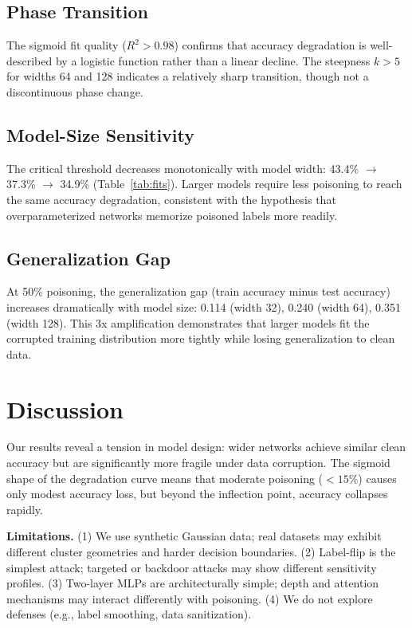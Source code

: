 \documentclass[11pt,a4paper]{article}
\begin{document}
\subsection{Phase Transition}
The sigmoid fit quality ($R^2 > 0.98$) confirms that accuracy degradation is well-described by a logistic function rather than a linear decline. The steepness $k > 5$ for widths 64 and 128 indicates a relatively sharp transition, though not a discontinuous phase change.

\subsection{Model-Size Sensitivity}
The critical threshold decreases monotonically with model width: 43.4\% $\to$ 37.3\% $\to$ 34.9\% (Table~\ref{tab:fits}). Larger models require less poisoning to reach the same accuracy degradation, consistent with the hypothesis that overparameterized networks memorize poisoned labels more readily.

\subsection{Generalization Gap}
At 50\% poisoning, the generalization gap (train accuracy minus test accuracy) increases dramatically with model size: 0.114 (width 32), 0.240 (width 64), 0.351 (width 128). This 3x amplification demonstrates that larger models fit the corrupted training distribution more tightly while losing generalization to clean data.

\section{Discussion}

Our results reveal a tension in model design: wider networks achieve similar clean accuracy but are significantly more fragile under data corruption. The sigmoid shape of the degradation curve means that moderate poisoning ($< 15\%$) causes only modest accuracy loss, but beyond the inflection point, accuracy collapses rapidly.

\textbf{Limitations.} (1) We use synthetic Gaussian data; real datasets may exhibit different cluster geometries and harder decision boundaries. (2) Label-flip is the simplest attack; targeted or backdoor attacks may show different sensitivity profiles. (3) Two-layer MLPs are architecturally simple; depth and attention mechanisms may interact differently with poisoning. (4) We do not explore defenses (e.g., label smoothing, data sanitization).
\end{document}
